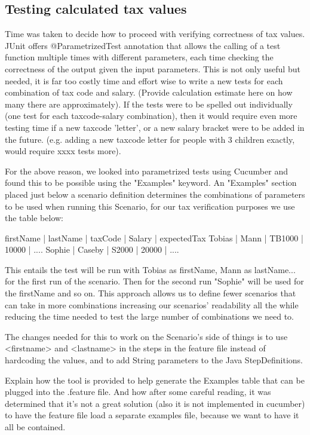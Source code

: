 \documentclass[11pt]{article}
\begin{document}
\subsection{Testing calculated tax values}

Time was taken to decide how to proceed with verifying correctness of tax values. JUnit offers @ParametrizedTest annotation that allows the calling of a test function multiple times with different parameters, each time checking the correctness of the output given the input parameters. This is not only useful but needed, it is far too costly time and effort wise to write a new tests for each combination of tax code and salary. (Provide calculation estimate here on how many there are approximately).
If the tests were to be spelled out individually (one test for each taxcode-salary combination), then it would require even more testing time if a new taxcode 'letter', or a new salary bracket were to be added in the future. (e.g. adding a new taxcode letter for people with 3 children exactly, would require xxxx tests more). 

For the above reason, we looked into parametrized tests using Cucumber and found this to be possible using the "Examples" keyword. 
An "Examples" section placed just below a scenario definition determines the combinations of parameters to be used when running this Scenario, for our tax verification purposes we use the table below: 

firstName	| lastName	| taxCode 	| Salary 	| expectedTax
Tobias 		| Mann 		| TB1000 	| 10000 	| ....
Sophie		| Caseby	| S2000 	| 20000		| ....

This entails the test will be run with Tobias as firstName, Mann as lastName... for the first run of the scenario. Then for the second run "Sophie" will be used for the firstName and so on. 
This approach allows us to define fewer scenarios that can take in more combinations increasing our scenarios' readability all the while reducing the time needed to test the large number of combinations we need to. 

The changes needed for this to work on the Scenario's side of things is to use <firstname> and <lastname> in the steps in the feature file instead of hardcoding the values, and to add String parameters to the Java StepDefinitions.

% 
Explain how the tool is provided to help generate the Examples table that can be plugged into the .feature file. And how after some careful reading, it was determined that it's not a great solution (also it is not implemented in cucumber) to have the feature file load a separate examples file, because we want to have it all be contained. 
\end{document}
